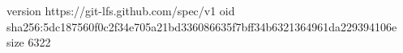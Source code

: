 version https://git-lfs.github.com/spec/v1
oid sha256:5dc187560f0c2f34e705a21bd336086635f7bff34b6321364961da229394106e
size 6322
